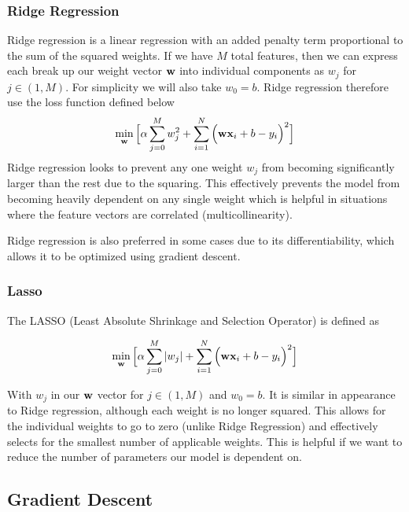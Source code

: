 \subsubsection{Ridge Regression}
Ridge regression is a linear regression with an added penalty term proportional to the sum of the squared weights. If we have $M$ total features, then we can express each break up our weight vector $\textbf{w}$ into individual components as  $w_j$ for $j\in (1,M)$. For simplicity we will also take $w_0 = b$. Ridge regression therefore use the loss function defined below
\begin{align}
    	\min_{\textbf{w}} \Big[\alpha\sum_{j=0}^Mw_j^2 + \sum_{i=1}^N\Big(\textbf{wx}_i +b - y_i\Big)^2 \Big]
\end{align}
Ridge regression looks to prevent any one weight $w_j$ from becoming significantly larger than the rest due to the squaring. This effectively prevents the model from becoming heavily dependent on any single weight which is helpful in situations where the feature vectors are correlated (multicollinearity). 

Ridge regression is also preferred in some cases due to its differentiability, which allows it to be optimized using gradient descent.

\subsubsection{Lasso}
The LASSO (Least Absolute Shrinkage and Selection Operator) is defined as 

\begin{align}
    	\min_{\textbf{w}} \Big[\alpha\sum_{j=0}^M|w_j| + \sum_{i=1}^N\Big(\textbf{wx}_i +b - y_i\Big)^2 \Big]
    	\end{align}
    	
With $w_j$ in our $\textbf{w}$ vector for $j\in (1,M)$ and $w_0 = b$. It is similar in appearance to Ridge regression, although each weight is no longer squared. This  allows for the individual weights to go to zero (unlike Ridge Regression) and effectively selects for the smallest number of applicable weights. This is helpful if we want to reduce the number of parameters our model is dependent on.


\subsection{Gradient Descent}\label{grad-descent}


